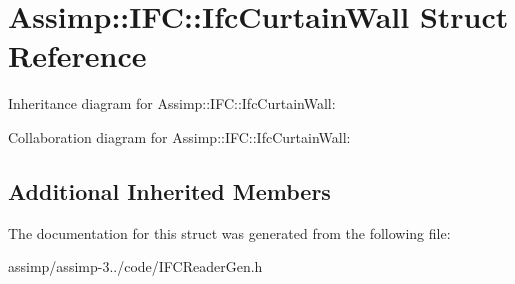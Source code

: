 \hypertarget{struct_assimp_1_1_i_f_c_1_1_ifc_curtain_wall}{\section{Assimp\+:\+:I\+F\+C\+:\+:Ifc\+Curtain\+Wall Struct Reference}
\label{struct_assimp_1_1_i_f_c_1_1_ifc_curtain_wall}
}


Inheritance diagram for Assimp\+:\+:I\+F\+C\+:\+:Ifc\+Curtain\+Wall\+:


Collaboration diagram for Assimp\+:\+:I\+F\+C\+:\+:Ifc\+Curtain\+Wall\+:
\subsection*{Additional Inherited Members}


The documentation for this struct was generated from the following file\+:\begin{DoxyCompactItemize}
\item 
assimp/assimp-\/3../code/I\+F\+C\+Reader\+Gen.\+h\end{DoxyCompactItemize}
